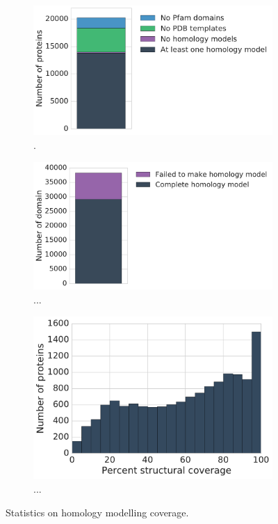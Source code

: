 \begin{figure}[!tb]
	\centering

	\begin{subfigure}[t]{0.5\textwidth}
		\centering
		\includegraphics[width=1\linewidth]{static/elaspic_training_set/elaspic_statistics/protein_statistics.pdf}
		\caption{.}
		\vspace*{10mm}
	\end{subfigure}%
	\begin{subfigure}[t]{0.5\textwidth}
		\centering
		\includegraphics[width=1\linewidth]{static/elaspic_training_set/elaspic_statistics/domain_statistics.pdf}
		\caption{...}
		\vspace*{10mm}
	\end{subfigure}

	\begin{subfigure}{1.0\textwidth}
		\centering
		\includegraphics[width=0.55\linewidth]{static/elaspic_training_set/elaspic_statistics/structural_coverage_hist.pdf}
		\caption{...}
	\end{subfigure}%
	\caption[Precalculated data for human proteins.]{Statistics on homology modelling coverage.}

\end{figure}


